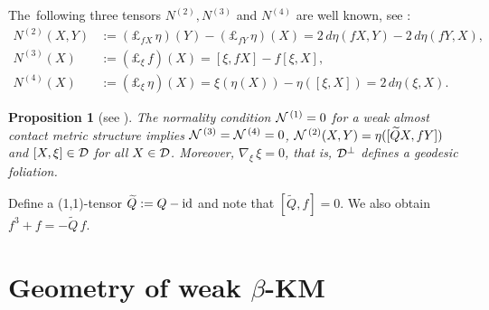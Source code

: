 \documentclass[11pt,a4paper,twoside]{article}
\newtheorem{theorem}{Theorem}%
\newtheorem{definition}{Definition}%
\newtheorem{proposition}{Proposition}%
\begin{document}
{%
The~following three tensors $N^{(2)}, N^{(3)}$ and $N^{(4)}$ are well known, see \cite{blair2010riemannian}:
\begin{align*}
 N^{(2)}(X,Y) &:= (\pounds_{{f} X}\,\eta)(Y) - (\pounds_{{f} Y}\,\eta)(X) = 2\,d\eta({f} X, Y) - 2\,d\eta({f} Y, X), \\
 N^{(3)}(X) &:= (\pounds_{\xi}\,{f})(X)
 = [\xi, {f} X] - {f} [\xi, X],\\
 N^{(4)}(X) &:= (\pounds_{\xi}\,\eta)(X)
 = \xi(\eta(X)) - \eta([\xi, X]) = 2\,d\eta(\xi, X).
\end{align*}

\begin{proposition}[see \cite{rov-119}]
The normality condition ${\cal N}^{\,(1)}=0$ for a weak almost contact metric structure implies
${\cal N}^{\,(3)} = {\cal N}^{\,(4)} = 0$, ${\cal N}^{\,(2)}(X,Y) = \eta([\widetilde QX, fY])$ and
 $[X,\xi]\in{\cal D}$ for all $X\in{\cal D}$.
Moreover, $\nabla_{\xi}\,\xi=0$, that is, ${\cal D}^\bot$ defines a geodesic foliation.
\end{proposition}

Define a (1,1)-tensor $\widetilde Q := Q - {\rm id}$
and note that $[\widetilde{Q},{f}]=0$.
We also obtain ${f}^3+{f} = -\widetilde{Q}\,{f}$.




\section{Geometry of weak $\beta$-KM}
\label{sec:02}

}
\end{document}
